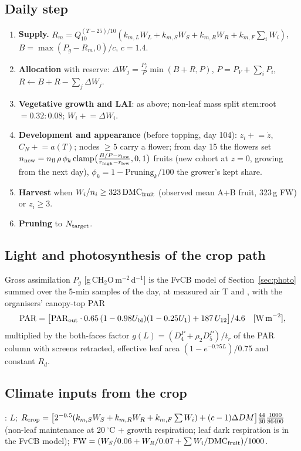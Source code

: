 \subsection{Daily step}
\begin{enumerate}[nosep]
\item \textbf{Supply.} $R_m=Q_{10}^{(T-25)/10}(k_{m,L}W_L+k_{m,S}W_S+k_{m,R}W_R+k_{m,F}\sum_iW_i)$, $B=\max(P_g-R_m,0)/c$, $c=1.4$.
\item \textbf{Allocation} with reserve: $\Delta W_j=\frac{P_j}{P}\min(B+R,P)$, $P=P_V+\sum_iP_i$, $R\leftarrow B+R-\sum_j\Delta W_j$.
\item \textbf{Vegetative growth and LAI}: as above; non-leaf mass split stem:root $=0.32:0.08$; $W_i\mathrel{+}=\Delta W_i$.
\item \textbf{Development and appearance} (before topping, day 104): $z_i\mathrel{+}=\dot z$, $C_N\mathrel{+}=a(T)$; nodes $\ge5$ carry a
flower; from day 15 the flowers set $n_{\rm new}=n_{\rm fl}\,\rho\,\phi_k\,\mathrm{clamp}\bigl(\frac{B/P-r_{\rm low}}{r_{\rm high}-r_{\rm low}},0,1\bigr)$
fruits (new cohort at $z=0$, growing from the next day), $\phi_k=1-\text{Pruning}_k/100$ the grower's kept share.
\item \textbf{Harvest} when $W_i/n_i\ge323\,\mathrm{DMC}_{\rm fruit}$ (observed mean A+B fruit, 323\,g FW) or $z_i\ge3$.
\item \textbf{Pruning} to $N_{\rm target}$.
\end{enumerate}

\subsection{Light and photosynthesis of the crop path}
Gross assimilation $P_g$ [g\,CH$_2$O\,m$^{-2}$\,d$^{-1}$] is the FvCB model of Section~\ref{sec:photo} summed over the 5-min
samples of the day, at measured air T and , with the organisers' canopy-top PAR
\begin{equation}
\mathrm{PAR}=\bigl[\mathrm{PAR}_{\rm out}\cdot0.65\,(1-0.98U_{\rm bl})(1-0.25U_1)+187\,U_{12}\bigr]/4.6\quad[\text{W\,m}^{-2}],
\end{equation}
multiplied by the both-faces factor $g(L)=(D_4^P+\rho_2D_5^P)/t_r$ of the PAR column with screens retracted, effective leaf
area $(1-e^{-0.75L})/0.75$ and constant $R_d$.

\subsection{Climate inputs from the crop}
: $L$; $R_{\rm crop}=\bigl[2^{-0.5}(k_{m,S}W_S+k_{m,R}W_R+k_{m,F}\sum W_i)+(c-1)\Delta DM\bigr]\frac{44}{30}\frac{1000}{86400}$
(non-leaf maintenance at 20\,$^\circ$C + growth respiration; leaf dark respiration is in the FvCB model);
$\mathrm{FW}=(W_S/0.06+W_R/0.07+\sum W_i/\mathrm{DMC}_{\rm fruit})/1000$.
